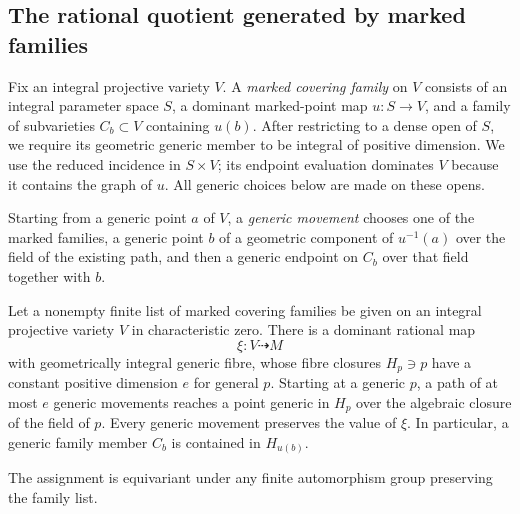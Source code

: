 \subsection{The rational quotient generated by marked families}

Fix an integral projective variety $V$. A \emph{marked covering family}
on $V$ consists of an integral parameter
space $S$, a dominant marked-point map $u:S\to V$, and a family of
subvarieties $C_b\subset V$ containing $u(b)$.  After restricting to a
dense open of $S$, we require its geometric generic member to be integral
of positive dimension.  We use the reduced incidence in $S\times V$;
its endpoint evaluation dominates $V$ because it contains the graph of
$u$.  All generic choices below are made on these opens.

Starting from a generic point $a$ of $V$, a \emph{generic movement}
chooses one of the marked families, a generic point $b$ of a geometric
component of $u^{-1}(a)$ over the field of the existing path, and then a
generic endpoint on $C_b$ over that field together with $b$.

\begin{lemma}\label{lem:generic-chain}
Let a nonempty finite list of marked covering families be given on an
integral projective variety $V$ in characteristic zero.  There is a
dominant rational map
\[
 \xi:V\dashrightarrow M
\]
with geometrically integral generic fibre, whose fibre closures
$H_p\ni p$ have a constant positive dimension $e$ for general $p$.
Starting at a generic $p$, a path of at most $e$ generic movements reaches
a point generic in $H_p$ over the algebraic closure of the field of $p$.
Every generic movement preserves the value of $\xi$.  In particular, a
generic family member $C_b$ is contained in $H_{u(b)}$.

The assignment is equivariant under any finite automorphism group
preserving the family list.
\end{lemma}

